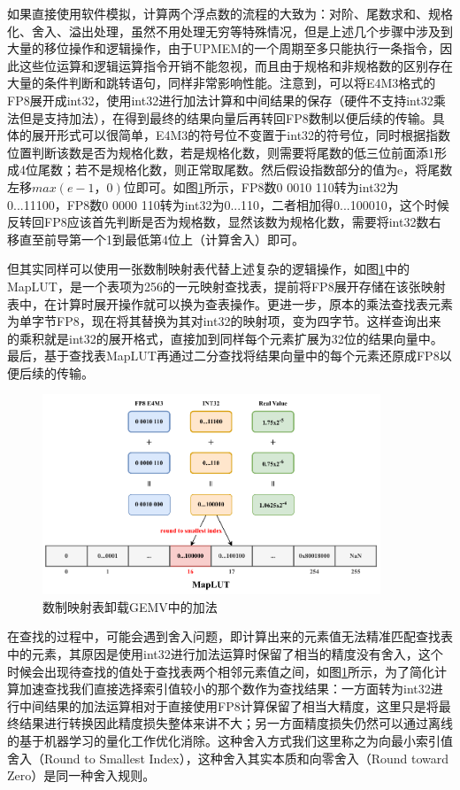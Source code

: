 如果直接使用软件模拟，计算两个浮点数的流程的大致为：对阶、尾数求和、规格化、舍入、溢出处理，虽然不用处理无穷等特殊情况，但是上述几个步骤中涉及到大量的移位操作和逻辑操作，由于UPMEM的一个周期至多只能执行一条指令\cite{UPMEMHotChips}，因此这些位运算和逻辑运算指令开销不能忽视，而且由于规格和非规格数的区别存在大量的条件判断和跳转语句，同样非常影响性能。注意到，可以将E4M3格式的FP8展开成int32，使用int32进行加法计算和中间结果的保存（硬件不支持int32乘法但是支持加法），在得到最终的结果向量后再转回FP8数制以便后续的传输。具体的展开形式可以很简单，E4M3的符号位不变置于int32的符号位，同时根据指数位置判断该数是否为规格化数，若是规格化数，则需要将尾数的低三位前面添1形成4位尾数；若不是规格化数，则正常取尾数。然后假设指数部分的值为e，将尾数左移$max(e-1，0)$位即可。如图\ref{LUTBS}所示，FP8数0 0010 110转为int32为0...11100，FP8数0 0000 110转为int32为0...110，二者相加得0...100010，这个时候反转回FP8应该首先判断是否为规格数，显然该数为规格化数，需要将int32数右移直至前导第一个1到最低第4位上（计算舍入）即可。

但其实同样可以使用一张数制映射表代替上述复杂的逻辑操作，如图\ref{LUTBS}中的MapLUT，是一个表项为256的一元映射查找表，提前将FP8展开存储在该张映射表中，在计算时展开操作就可以换为查表操作。更进一步，原本的乘法查找表元素为单字节FP8，现在将其替换为其对int32的映射项，变为四字节。这样查询出来的乘积就是int32的展开格式，直接加到同样每个元素扩展为32位的结果向量中。最后，基于查找表MapLUT再通过二分查找将结果向量中的每个元素还原成FP8以便后续的传输。

\begin{figure}[!htbp]
	\centering
    \includegraphics[width=0.9\textwidth]{figures/BinarySearch.pdf}
	\caption{数制映射表卸载GEMV中的加法}
    \label{LUTBS}
\end{figure}

在查找的过程中，可能会遇到舍入问题，即计算出来的元素值无法精准匹配查找表中的元素，其原因是使用int32进行加法运算时保留了相当的精度没有舍入，这个时候会出现待查找的值处于查找表两个相邻元素值之间，如图\ref{LUTBS}所示，为了简化计算加速查找我们直接选择索引值较小的那个数作为查找结果：一方面转为int32进行中间结果的加法运算相对于直接使用FP8计算保留了相当大精度，这里只是将最终结果进行转换因此精度损失整体来讲不大；另一方面精度损失仍然可以通过离线的基于机器学习的量化工作优化消除。这种舍入方式我们这里称之为向最小索引值舍入（Round to Smallest Index），这种舍入其实本质和向零舍入（Round toward Zero）是同一种舍入规则。

